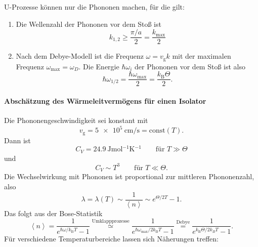 	U-Prozesse können nur die Phononen machen, für die gilt:
	\begin{enumerate}
		\item Die Wellenzahl der Phononen vor dem Stoß ist
			$$
			k_{1,2} \ge \frac{\pi/a}{2} = \frac{k_{\text{max}}}{2}
			$$ 
		\item Nach dem Debye-Modell ist die Frequenz $\omega = v_{\text{g}} k$ mit der maximalen Frequenz $\omega_{\text{max}}= \omega_{D}$. Die Energie $\hbar\omega_i$ der Phononen vor dem Stoß ist also
			\begin{equation}
				\label{eq:II.6.28}
				\hbar \omega_{1 /2} = \frac{\hbar  \omega_{\text{max}}}{2} = \frac{k_{\mathrm{B}} \Theta}{2}.
			\end{equation}
	\end{enumerate}

\paragraph{Abschätzung des Wärmeleitvermögens für einen Isolator} 
	Die Phononengeschwindigkeit sei konstant mit 
	$$
		{v_{\text{g}} = \SI{5 e5}{\centi \meter \per \second}=\text{const}(T)}.
	$$ 
	Dann ist
	$$
		C_{V} = \SI{24,9}{\joule \mol^{-1} \kelvin^{-1}} \qquad\text{für }T \gg \Theta
	$$
	und
	$$
		C_{V}\sim T^3 \qquad\text{für }T\ll\Theta.
	$$ 
	Die Wechselwirkung mit Phononen ist proportional zur mittleren Phononenzahl, also
	\begin{equation}
		\label{eq:II.6.29}
		\lambda = \lambda(T) \sim \frac{1}{\left< n \right>} \sim e^{\Theta / 2T} -1.
	\end{equation}
	Das folgt aus der Bose-Statistik
	$$
	\left< n \right> = \frac{1}{e^{\hbar \omega / k_{\mathrm{B}}T}-1} \overset{\text{Umklappprozesse}}{\simeq} \frac{1}{e^{\hbar  \omega_{\text{max}} / 2 k_{\mathrm{B}}T}-1} \overset{\text{Debye}}= \frac{1}{e^{k_{\mathrm{B}} \Theta /2 k_{B}T} - 1}.
	$$ 
	Für verschiedene Temperaturbereiche lassen sich Näherungen treffen:

